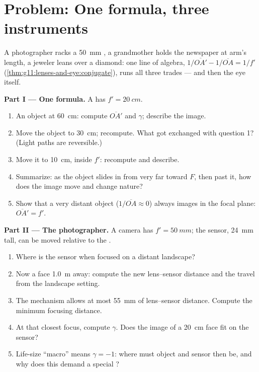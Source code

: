 \section{Problem: One formula, three instruments}

\begin{problem}
\label{pb:g11:lenses-and-eye:1}
A photographer racks a \qty{50}{mm} , a grandmother holds the
newspaper at arm's length, a jeweler leans over a diamond: one line of
algebra, $1/\overline{OA'} - 1/\overline{OA} = 1/f'$
(\cref{thm:g11:lenses-and-eye:conjugate}), runs all three trades ---
and then the eye itself.

\medskip
\noindent\textbf{Part I --- One formula.} A  has
$f' = \qty{20}{cm}$.
\begin{enumerate}
  \item An object at \qty{60}{cm}: compute $\overline{OA'}$ and
        $\gamma$; describe the image.
  \item Move the object to \qty{30}{cm}; recompute. What got exchanged
        with question 1? (Light paths are reversible.)
  \item Move it to \qty{10}{cm}, inside $f'$: recompute and describe.
  \item Summarize: as the object slides in from very far toward $F$,
        then past it, how does the image move and change nature?
  \item Show that a very distant object ($1/\overline{OA} \approx 0$)
        always images in the focal plane: $\overline{OA'} = f'$.
\end{enumerate}

\medskip
\noindent\textbf{Part II --- The photographer.}
A camera  has $f' = \qty{50}{mm}$; the sensor, \qty{24}{mm} tall,
can be moved relative to the .
\begin{enumerate}[resume]
  \item Where is the sensor when focused on a distant landscape?
  \item Now a face \qty{1.0}{m} away: compute the new lens--sensor
        distance and the travel from the landscape setting.
  \item The mechanism allows at most \qty{55}{mm} of lens--sensor
        distance. Compute the minimum focusing distance.
  \item At that closest focus, compute $\gamma$. Does the image of a
        \qty{20}{cm} face fit on the sensor?
  \item Life-size ``macro'' means $\gamma = -1$: where must object and
        sensor then be, and why does this demand a special ?
\end{enumerate}


\end{problem}
